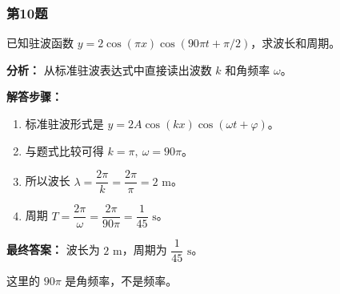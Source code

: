 \documentclass[12pt,a4paper]{ctexart}
\begin{document}
\subsubsection*{第10题}
\begin{tcolorbox}[colback=gray!2!white,colframe=black!60,title={题目}]
已知驻波函数 \(y=2\cos(\pi x)\cos(90\pi t+\pi/2)\)，求波长和周期。\par
\end{tcolorbox}
\begin{tcolorbox}[colback=blue!2!white,colframe=blue!55!black,title={完整答案}]
\textbf{分析：}
从标准驻波表达式中直接读出波数 \(k\) 和角频率 \(\omega\)。\par
\textbf{解答步骤：}
\begin{enumerate}
\item 标准驻波形式是 \(y=2A\cos(kx)\cos(\omega t+\varphi)\)。
\item 与题式比较可得 \(k=\pi,\ \omega=90\pi\)。
\item 所以波长 \(\lambda=\dfrac{2\pi}{k}=\dfrac{2\pi}{\pi}=2\text{ m}\)。
\item 周期 \(T=\dfrac{2\pi}{\omega}=\dfrac{2\pi}{90\pi}=\dfrac{1}{45}\text{ s}\)。
\end{enumerate}
\textbf{最终答案：}
波长为 \(2\text{ m}\)，周期为 \(\dfrac{1}{45}\text{ s}\)。\par
\end{tcolorbox}
\begin{tcolorbox}[colback=red!2!white,colframe=red!55!black,title={易错点}]
这里的 \(90\pi\) 是角频率，不是频率。\par
\end{tcolorbox}
\end{document}
